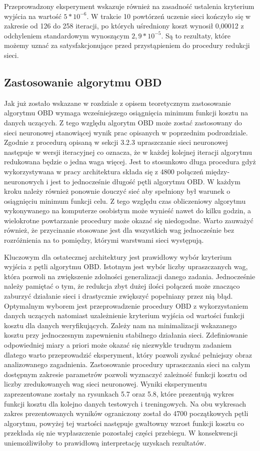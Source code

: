 \par Przeprowadzony eksperyment wskazuje również na zasadność ustalenia kryterium wyjścia na wartość \( 5*10^{-6} \). W trakcie 10 powtórzeń uczenie sieci kończyło się w zakresie od 126 do 258 iteracji, po których uśredniony koszt wynosił 0,00012 z odchyleniem standardowym wynoszącym \( 2,9*10^{-5} \). Są to rezultaty, które możemy uznać za satysfakcjonujące przed przystąpieniem do procedury redukcji sieci.

\subsection{Zastosowanie algorytmu OBD}
Jak już zostało wskazane w rozdziale z opisem teoretycznym zastosowanie algorytmu OBD wymaga wcześniejszego osiągnięcia minimum funkcji kosztu na danych uczących. Z tego względu algorytm OBD może zostać zastosowany do sieci neuronowej stanowiącej wynik prac opisanych w poprzednim podrozdziale. Zgodnie z procedurą opisaną w sekcji 3.2.3 upraszczanie sieci neuronowej następuje w wersji iteracyjnej co oznacza, że w każdej kolejnej iteracji algorytmu redukowana będzie o jedna waga więcej. Jest to stosunkowo długa procedura gdyż wykorzystywana w pracy architektura składa się z 4800 połączeń między-neuronowych i jest to jednocześnie długość pętli algorytmu OBD. W każdym kroku należy również ponownie douczyć sieć aby spełniony był warunek o osiągnięciu minimum funkcji celu. Z tego względu czas obliczeniowy algorytmu wykonywanego na komputerze osobistym może wynieść nawet do kilku godzin, a wielokrotne powtarzanie procedury może okazać się niedogodne. Warto zauważyć również, że przycinanie stosowane jest dla wszystkich wag jednocześnie bez rozróżnienia na to pomiędzy, którymi warstwami sieci występują.
\par Kluczowym dla ostatecznej architektury jest prawidłowy wybór kryterium wyjścia z pętli algorytmu OBD. Istotnym jest wybór liczby upraszczanych wag, która pozwoli na zwiększenie zdolności generalizacji danego zadania. Jednocześnie należy pamiętać o tym, że redukcja zbyt dużej ilości połączeń może znacząco zaburzyć działanie sieci i drastycznie zwiększyć popełniany przez nią błąd. Optymalnym wyborem jest przeprowadzenie procedury OBD z wykorzystaniem danych uczących natomiast uzależnienie kryterium wyjścia od wartości funkcji kosztu dla danych weryfikujących. Zależy nam na minimalizacji wskazanego kosztu przy jednoczesnym zapewnieniu stabilnego działania sieci. Zdefiniowanie odpowiedniej miary a priori może okazać się niezwykle trudnym zadaniem dlatego warto przeprowadzić eksperyment, który pozwoli zyskać pełniejszy obraz analizowanego zagadnienia. Zastosowanie procedury upraszczania sieci na całym dostępnym zakresie parametrów pozwoli wyznaczyć zależność funkcji kosztu od liczby zredukowanych wag sieci neuronowej. Wyniki eksperymentu zaprezentowane zostały na rysunkach 5.7 oraz 5.8, które prezentują wykres funkcji kosztu dla kolejno danych testowych i treningowych. Na obu wykresach zakres prezentowanych wyników ograniczony został do 4700 początkowych pętli algorytmu, powyżej tej wartości następuje gwałtowny wzrost funkcji kosztu co przekłada się nie wypłaszczenie pozostałej części przebiegu. W konsekwencji uniemożliwiłoby to prawidłową interpretację uzyskach rezultatów.

